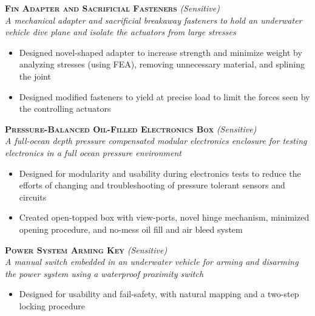 \documentclass[12pt, landscape]{article}
\begin{document}
  \clearpage

  \begin{samepage}
    \textbf{\scshape Fin Adapter and Sacrificial Fasteners} \textit{(Sensitive)}\\
    \textit{A mechanical adapter and sacrificial breakaway fasteners to hold an underwater vehicle dive plane and isolate the actuators from large stresses}
    \begin{itemize}      
      \item Designed novel-shaped adapter to increase strength and minimize weight by analyzing stresses (using FEA), removing unnecessary material, and splining the joint
      \item Designed modified fasteners to yield at precise load to limit the forces seen by the controlling actuators
    \end{itemize}
  \end{samepage}


  \begin{samepage}
    \textbf{\scshape Pressure-Balanced Oil-Filled Electronics Box} \textit{(Sensitive)}\\
    \textit{A full-ocean depth pressure compensated modular electronics enclosure for testing electronics in a full ocean pressure environment}
    \begin{itemize}      
      \item Designed for modularity and usability during electronics tests to reduce the efforts of changing and troubleshooting of pressure tolerant sensors and circuits
      \item Created open-topped box with view-ports, novel hinge mechanism, minimized opening procedure, and no-mess oil fill and air bleed system
    \end{itemize}
  \end{samepage}

  \begin{samepage}
    \textbf{\scshape Power System Arming Key} \textit{(Sensitive)}\\
    \textit{A manual switch embedded in an underwater vehicle for arming and disarming the power system using a waterproof proximity switch}
    \begin{itemize}      
      \item Designed for usability and fail-safety, with natural mapping and a two-step locking procedure
    \end{itemize}
  \end{samepage}
\end{document}
